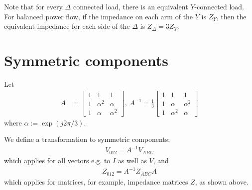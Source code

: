 \documentclass[11pt]{article}
\begin{document}
Note that for every $\Delta$ connected load, there is an equivalent $Y$-connected load. For balanced power flow, if the impedance on each arm of the $Y$ is $Z_Y$, then the equivalent impedance for each side of the $\Delta$ is $Z_\Delta = 3Z_Y$.

\section{Symmetric components}
Let 
\begin{align}
	A &= \left[
		\begin{array}{lll}
			1 & 1 & 1 \\
			1 & \alpha^2 & \alpha \\
			1 & \alpha & \alpha^2
		\end{array}
	\right],\;
	A^{-1} = \frac{1}{3}\left[
		\begin{array}{lll}
			1 & 1 & 1 \\
			1 & \alpha & \alpha^2 \\
			1 & \alpha^2 & \alpha
		\end{array}
	\right]
\end{align}
where $\alpha := \exp(j2\pi/3)$.

We define a transformation to symmetric components:
\begin{align}
	V_{012} = A^{-1}V_{ABC}
\end{align}
which applies for all vectors e.g. to $I$ as well as $V$, and
\begin{align}
	Z_{012} = A^{-1}Z_{ABC}A
\end{align}
which applies for matrices, for example, impedance matrices $Z$, as shown above.
\end{document}
